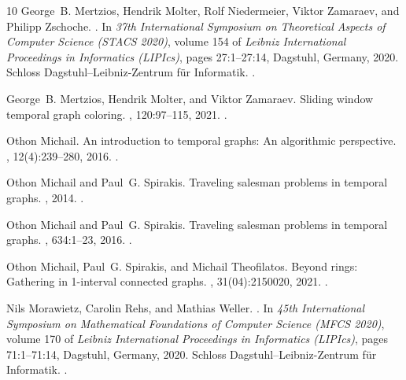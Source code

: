 \documentclass[10pt,a4paper]{article}
\begin{document}
\begin{thebibliography}{10}
George~B. Mertzios, Hendrik Molter, Rolf Niedermeier, Viktor Zamaraev, and
  Philipp Zschoche.
.
\newblock In {\em 37th International Symposium on Theoretical Aspects of
  Computer Science (STACS 2020)}, volume 154 of {\em Leibniz International
  Proceedings in Informatics (LIPIcs)}, pages 27:1--27:14, Dagstuhl, Germany,
  2020. Schloss Dagstuhl--Leibniz-Zentrum f{\"u}r Informatik.
\newblock \href {https://doi.org/10.4230/LIPIcs.STACS.2020.27}
  {}.

George~B. Mertzios, Hendrik Molter, and Viktor Zamaraev.
\newblock Sliding window temporal graph coloring.
, 120:97--115, 2021.
\newblock \href {https://doi.org/10.1016/j.jcss.2021.03.005}
  {}.

Othon Michail.
\newblock An introduction to temporal graphs: An algorithmic perspective.
, 12(4):239--280, 2016.
\newblock \href {https://doi.org/10.1080/15427951.2016.1177801}
  {}.

Othon Michail and Paul~G. Spirakis.
\newblock Traveling salesman problems in temporal graphs.
, 2014.
\newblock \href {https://doi.org/10.1016/j.tcs.2016.04.006}
  {}.

Othon Michail and Paul~G. Spirakis.
\newblock Traveling salesman problems in temporal graphs.
, 634:1--23, 2016.
\newblock \href {https://doi.org/10.1016/j.tcs.2016.04.006}
  {}.

Othon Michail, Paul~G. Spirakis, and Michail Theofilatos.
\newblock Beyond rings: Gathering in 1-interval connected graphs.
, 31(04):2150020, 2021.
\newblock \href {https://doi.org/10.1142/S0129626421500201}
  {}.

Nils Morawietz, Carolin Rehs, and Mathias Weller.
.
\newblock In {\em 45th International Symposium on Mathematical Foundations of
  Computer Science (MFCS 2020)}, volume 170 of {\em Leibniz International
  Proceedings in Informatics (LIPIcs)}, pages 71:1--71:14, Dagstuhl, Germany,
  2020. Schloss Dagstuhl--Leibniz-Zentrum f{\"u}r Informatik.
\newblock \href {https://doi.org/10.4230/LIPIcs.MFCS.2020.71}
  {}.


\end{thebibliography}
\end{document}
